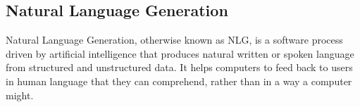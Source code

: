 \subsection{Natural Language Generation}

Natural Language Generation, otherwise known as NLG, is a software process driven by artificial intelligence that produces natural written or spoken language from structured and unstructured data. It helps computers to feed back to users in human language that they can comprehend, rather than in a way a computer might.